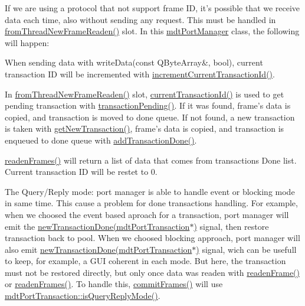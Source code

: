 If we are using a protocol that not support frame I\-D, it's possible that we receive data each time, also without sending any request. This must be handled in \hyperlink{classmdt_port_manager_a4fcc8f0699b655156e661bb3de6056cc}{from\-Thread\-New\-Frame\-Readen()} slot. In this \hyperlink{classmdt_port_manager}{mdt\-Port\-Manager} class, the following will happen\-:
\begin{DoxyItemize}
\item When sending data with write\-Data(const Q\-Byte\-Array\&, bool), current transaction I\-D will be incremented with \hyperlink{classmdt_port_manager_a4d009936a0a5130f3bfecb69fee4ce42}{increment\-Current\-Transaction\-Id()}.
\item In \hyperlink{classmdt_port_manager_a4fcc8f0699b655156e661bb3de6056cc}{from\-Thread\-New\-Frame\-Readen()} slot, \hyperlink{classmdt_port_manager_a19abf29c8948cde0337d67c9722c25aa}{current\-Transaction\-Id()} is used to get pending transaction with \hyperlink{classmdt_port_manager_a18478707a9be7638b06cde48ced48297}{transaction\-Pending()}. If it was found, frame's data is copied, and transaction is moved to done queue. If not found, a new transaction is taken with \hyperlink{classmdt_port_manager_a75ebd3d1859e3ed38b9558981e53aac4}{get\-New\-Transaction()}, frame's data is copied, and transaction is enqueued to done queue with \hyperlink{classmdt_port_manager_a4b584d9005316be9991e6026e4c5e5a4}{add\-Transaction\-Done()}.
\item \hyperlink{classmdt_port_manager_addd5dcae9644cea42a9871205af41796}{readen\-Frames()} will return a list of data that comes from transactions Done list. Current transaction I\-D will be restet to 0.
\end{DoxyItemize}

The Query/\-Reply mode\-: port manager is able to handle event or blocking mode in same time. This cause a problem for done transactions handling. For example, when we choosed the event based aproach for a transaction, port manager will emit the \hyperlink{classmdt_port_manager_a416a24db1048e9f66aef27ea810954d2}{new\-Transaction\-Done(mdt\-Port\-Transaction$\ast$)} signal, then restore transaction back to pool. When we choosed blocking approach, port manager will also emit \hyperlink{classmdt_port_manager_a416a24db1048e9f66aef27ea810954d2}{new\-Transaction\-Done(mdt\-Port\-Transaction$\ast$)} signal, wich can be usefull to keep, for example, a G\-U\-I coherent in each mode. But here, the transaction must not be restored directly, but only once data was readen with \hyperlink{classmdt_port_manager_a830ae182d06dd6a52c43a7f45b9240ac}{readen\-Frame()} or \hyperlink{classmdt_port_manager_addd5dcae9644cea42a9871205af41796}{readen\-Frames()}. To handle this, \hyperlink{classmdt_port_manager_a84d37b380080eb26e56c68424dedd958}{commit\-Frames()} will use \hyperlink{classmdt_port_transaction_a9da1cc7a191cd21a2e532d277aa3c628}{mdt\-Port\-Transaction\-::is\-Query\-Reply\-Mode()}. 

